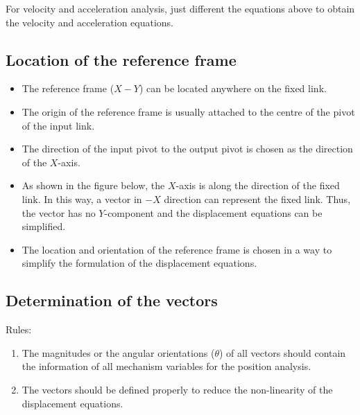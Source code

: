 \documentclass[11pt]{article}
\begin{document}
For velocity and acceleration analysis, just different the equations above to obtain the velocity and acceleration equations.

 \newpage
\subsection{Location of the reference frame}
\label{sec:org57d0272}
\begin{itemize}
\item The reference frame (\(X-Y\)) can be located anywhere on the fixed link.
\item The origin of the reference frame is usually attached to the centre of the pivot of the input link.
\item The direction of the input pivot to the output pivot is chosen as the direction of the \(X\)-axis.
\item As shown in the figure below, the \(X\)-axis is along the direction of the fixed link. In this way, a vector in \(-X\) direction can represent the fixed link. Thus, the vector has no \(Y\)-component and the displacement equations can be simplified.
\item The location and orientation of the reference frame is chosen in a way to simplify the formulation of the displacement equations.
\end{itemize}
\subsection{Determination of the vectors}
\label{sec:orgc0ff3cc}
Rules:
\begin{enumerate}
\item The magnitudes or the angular orientations (\(\theta\)) of all vectors should contain the information of all mechanism variables for the position analysis.
\item The vectors should be defined properly to reduce the non-linearity of the displacement equations.
\end{enumerate}

 \newpage
\end{document}
